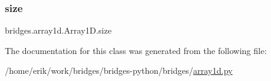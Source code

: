 \subsubsection{\texorpdfstring{size}{size}}
{\footnotesize\ttfamily bridges.\+array1d.\+Array1\+D.\+size}



The documentation for this class was generated from the following file\+:\begin{DoxyCompactItemize}
\item 
/home/erik/work/bridges/bridges-\/python/bridges/\hyperlink{array1d_8py}{array1d.\+py}\end{DoxyCompactItemize}

